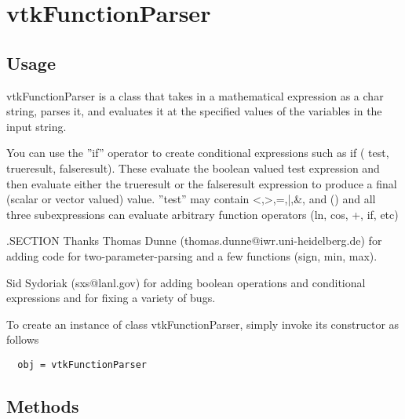 \section{vtkFunctionParser}

\subsection{Usage}

 vtkFunctionParser is a class that takes in a mathematical expression as
 a char string, parses it, and evaluates it at the specified values of
 the variables in the input string.

 You can use the ''if'' operator to create conditional expressions
 such as if ( test, trueresult, falseresult). These evaluate the boolean
 valued test expression and then evaluate either the trueresult or the 
 falseresult expression to produce a final (scalar or vector valued) value.
 ''test'' may contain <,>,=,|,\&, and () and all three subexpressions can
 evaluate arbitrary function operators (ln, cos, +, if, etc)

 .SECTION Thanks
 Thomas Dunne (thomas.dunne@iwr.uni-heidelberg.de) for adding code for
 two-parameter-parsing and a few functions (sign, min, max).

 Sid Sydoriak (sxs@lanl.gov) for adding boolean operations and
 conditional expressions and for fixing a variety of bugs.

To create an instance of class vtkFunctionParser, simply
invoke its constructor as follows
\begin{verbatim}
  obj = vtkFunctionParser
\end{verbatim}
\subsection{Methods}

